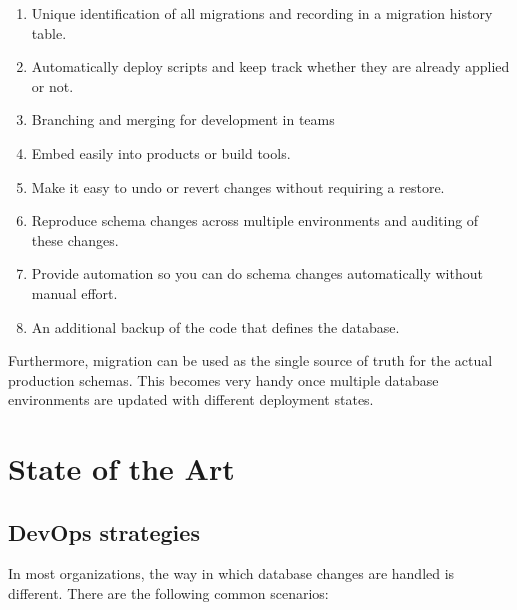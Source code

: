 \begin{enumerate}
	\item Unique identification of all migrations and recording in a migration history table.
    \item Automatically deploy scripts and keep track whether they are already applied or not.
    \item Branching and merging for development in teams
    \item Embed easily into products or build tools.
    \item Make it easy to undo or revert changes without requiring a restore.
    \item Reproduce schema changes across multiple environments and auditing of these changes.
    \item Provide automation so you can do schema changes automatically without manual effort.
    \item An additional backup of the code that defines the database.
\end{enumerate}


Furthermore, migration can be used as the single source of truth for the actual production schemas. This becomes very handy once multiple database environments are updated with different deployment states.


\newpage
\section{State of the Art}%
\subsection{DevOps strategies}
%
In most organizations, the way in which database changes are handled is different. There are the following common scenarios:

